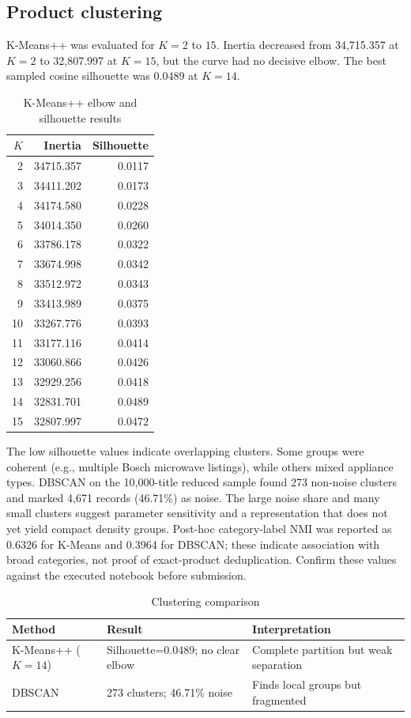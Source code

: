 \documentclass[conference]{IEEEtran}
\begin{document}
\subsection{Product clustering}
K-Means++ was evaluated for $K=2$ to $15$. Inertia decreased from 34,715.357 at $K=2$ to 32,807.997 at $K=15$, but the curve had no decisive elbow. The best sampled cosine silhouette was 0.0489 at $K=14$.
\begin{table}[t]
\caption{K-Means++ elbow and silhouette results}
\centering\scriptsize
\begin{tabular}{rrr}
\toprule $K$ & Inertia & Silhouette\\\midrule
2 & 34715.357 & 0.0117\\3 & 34411.202 & 0.0173\\4 & 34174.580 & 0.0228\\
5 & 34014.350 & 0.0260\\6 & 33786.178 & 0.0322\\7 & 33674.998 & 0.0342\\
8 & 33512.972 & 0.0343\\9 & 33413.989 & 0.0375\\10 & 33267.776 & 0.0393\\
11 & 33177.116 & 0.0414\\12 & 33060.866 & 0.0426\\13 & 32929.256 & 0.0418\\
14 & 32831.701 & 0.0489\\15 & 32807.997 & 0.0472\\
\bottomrule
\end{tabular}
\end{table}
The low silhouette values indicate overlapping clusters. Some groups were coherent (e.g., multiple Bosch microwave listings), while others mixed appliance types. DBSCAN on the 10,000-title reduced sample found 273 non-noise clusters and marked 4,671 records (46.71\%) as noise. The large noise share and many small clusters suggest parameter sensitivity and a representation that does not yet yield compact density groups. Post-hoc category-label NMI was reported as 0.6326 for K-Means and 0.3964 for DBSCAN; these indicate association with broad categories, not proof of exact-product deduplication. Confirm these values against the executed notebook before submission.

\begin{table}[t]
\caption{Clustering comparison}
\centering\scriptsize
\begin{tabular}{p{}p{}p{}}
\toprule Method & Result & Interpretation\\\midrule
K-Means++ ($K=14$) & Silhouette=0.0489; no clear elbow & Complete partition but weak separation\\
DBSCAN & 273 clusters; 46.71\% noise & Finds local groups but fragmented\\
\bottomrule
\end{tabular}
\end{table}
\end{document}
